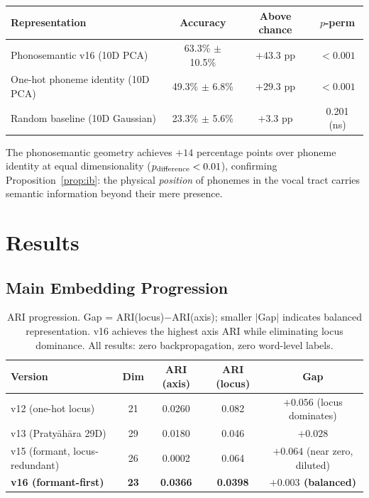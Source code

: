 \documentclass{article}
\begin{document}
\begin{center}
\renewcommand{\arraystretch}{1.3}
\begin{tabular}{lccc}
\toprule
\textbf{Representation} & \textbf{Accuracy} & \textbf{Above chance} & \textbf{$p$-perm}\\
\midrule
Phonosemantic v16 (10D PCA) & 63.3\% $\pm$ 10.5\% & $+43.3$ pp & $<0.001$\\
One-hot phoneme identity (10D PCA) & 49.3\% $\pm$ 6.8\%  & $+29.3$ pp & $<0.001$\\
Random baseline (10D Gaussian) & 23.3\% $\pm$ 5.6\%  & $+3.3$ pp  & 0.201 (ns)\\
\bottomrule
\end{tabular}
\end{center}

The phonosemantic geometry achieves $+14$ percentage points over phoneme identity at equal dimensionality ($p_{\rm difference} < 0.01$), confirming Proposition~\ref{prop:ib}: the physical \textit{position} of phonemes in the vocal tract carries semantic information beyond their mere presence.

\section{Results}
\label{sec:results}

\subsection{Main Embedding Progression}

\begin{table}[htbp]
\centering
\renewcommand{\arraystretch}{1.3}
\begin{tabular}{lcccc}
\toprule
\textbf{Version} & \textbf{Dim} & \textbf{ARI (axis)} & \textbf{ARI (locus)} & \textbf{Gap}\\
\midrule
v12 (one-hot locus)            & 21 & 0.0260 & 0.082 & $+0.056$ (locus dominates)\\
v13 (Pratyāhāra 29D)           & 29 & 0.0180 & 0.046 & $+0.028$\\
v15 (formant, locus-redundant) & 26 & 0.0002 & 0.064 & $+0.064$ (near zero, diluted)\\
\textbf{v16 (formant-first)}   & \textbf{23} & \textbf{0.0366} & \textbf{0.0398} & \textbf{$+0.003$ (balanced)}\\
\bottomrule
\end{tabular}
\caption{ARI progression. Gap = ARI(locus)$-$ARI(axis); smaller $|$Gap$|$ indicates balanced representation. v16 achieves the highest axis ARI while eliminating locus dominance. All results: zero backpropagation, zero word-level labels.}
\label{tab:ari}
\end{table}
\end{document}
